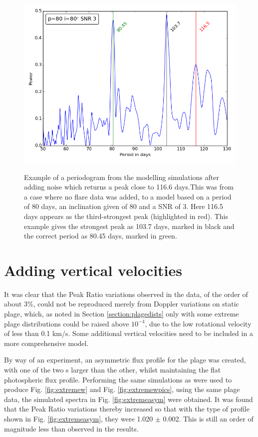 \begin{figure}[!htbp]
\begin{center}
\includegraphics[scale=0.4]{Figures/badeg.png} \\
\end{center}
\caption{Example of a periodogram from the modelling simulations after adding noise which returns a peak close to 116.6
days.This was from a case where no flare data was added, to a model based on a period of 80 days, an inclination given
of 80{\degree} and a SNR of 3. Here 116.5 days appears as the third-strongest peak (highlighted in red). This example
gives the strongest peak as 103.7 days, marked in black and the correct period as 80.45 days, marked in green.}
\protect\label{fig:rec116}
\end{figure}

\section{Adding vertical velocities}
\protect\label{section:vertvels}

It was clear that the Peak Ratio variations observed in the {\harps} data, of the order of about 3\%, could not be
reproduced merely from Doppler variations on static plage, which, as noted in Section \ref{section:plagedists} only with
some extreme plage distributions could be raised above $10^{-4}$, due to the low rotational velocity of less than 0.1
km/s.  Some additional vertical velocities need to be included in a more comprehensive model.

By way of an experiment, an asymmetric flux profile for the plage was created, with one of the two \horn s larger than
the other, whilst maintaining the flat photospheric flux profile. Performing the same simulations as were used to
produce Fig. \ref{fig:extremew} and Fig. \ref{fig:extremewpics}, using the same plage data, the simulated spectra in
Fig. \ref{fig:extremeasym} were obtained. It was found that the Peak Ratio variations thereby increased so that with the
type of profile shown in Fig. \ref{fig:extremeasym}, they were 1.020 $\pm$ 0.002. This is still an order of magnitude
less than observed in the {\harps} results.

